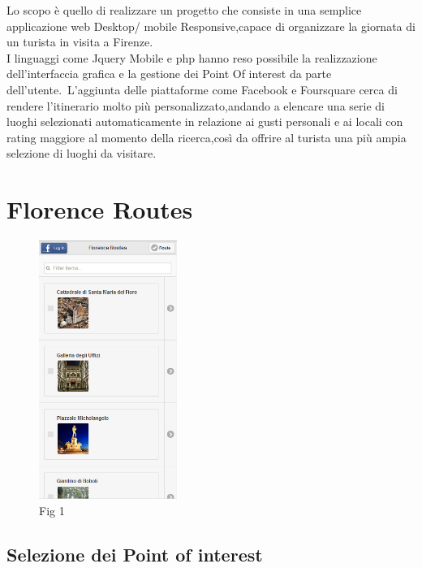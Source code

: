 Lo scopo è quello di realizzare un progetto che consiste in una semplice applicazione web Desktop/ mobile Responsive,capace di organizzare la giornata di un turista in visita a Firenze.\\
I linguaggi come Jquery Mobile e php hanno reso possibile la realizzazione dell'interfaccia grafica e la gestione dei Point Of interest da parte dell'utente.\
L'aggiunta delle piattaforme come Facebook e Foursquare cerca di rendere l'itinerario molto più personalizzato,andando a elencare una serie di luoghi selezionati automaticamente in relazione ai gusti personali e ai locali con rating maggiore al momento della ricerca,così da offrire al turista una più ampia selezione di luoghi da visitare.  


 
\chapter{Florence Routes}
\begin{figure}
  \vspace{-20pt}
  \begin{center}
   
\includegraphics[width=0.40\textwidth]{img/fig1}
  \end{center}
  \vspace{-20pt}
  \caption*{Fig 1}
  \vspace{-10pt}
\end{figure}
\section{Selezione dei Point of interest}

